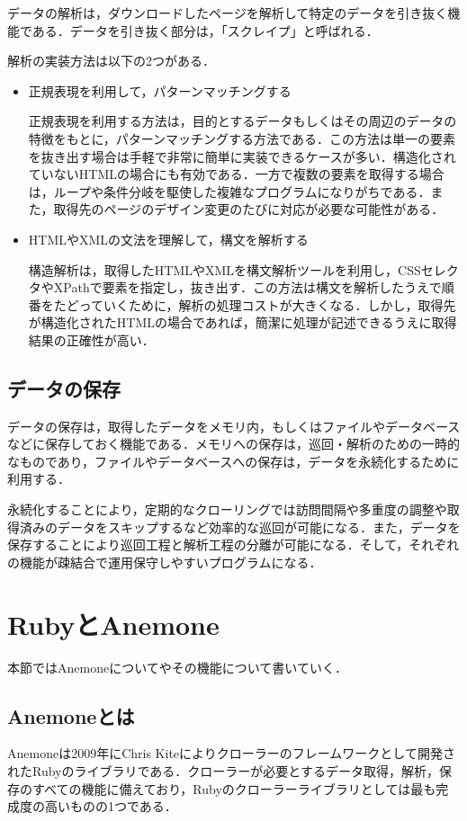 データの解析は，ダウンロードしたページを解析して特定のデータを引き抜く機能である．データを引き抜く部分は，「スクレイプ」と呼ばれる．

解析の実装方法は以下の2つがある．

\begin{itemize}
  \item 正規表現を利用して，パターンマッチングする

正規表現を利用する方法は，目的とするデータもしくはその周辺のデータの特徴をもとに，パターンマッチングする方法である．この方法は単一の要素を抜き出す場合は手軽で非常に簡単に実装できるケースが多い．構造化されていないHTMLの場合にも有効である．一方で複数の要素を取得する場合は，ループや条件分岐を駆使した複雑なプログラムになりがちである．また，取得先のページのデザイン変更のたびに対応が必要な可能性がある．
  \item HTMLやXMLの文法を理解して，構文を解析する

構造解析は，取得したHTMLやXMLを構文解析ツールを利用し，CSSセレクタやXPathで要素を指定し，抜き出す．この方法は構文を解析したうえで順番をたどっていくために，解析の処理コストが大きくなる．しかし，取得先が構造化されたHTMLの場合であれば，簡潔に処理が記述できるうえに取得結果の正確性が高い\cite{miyake}．
\end{itemize}

\subsection{データの保存}

データの保存は，取得したデータをメモリ内，もしくはファイルやデータベースなどに保存しておく機能である．メモリへの保存は，巡回・解析のための一時的なものであり，ファイルやデータベースへの保存は，データを永続化するために利用する．

永続化することにより，定期的なクローリングでは訪問間隔や多重度の調整や取得済みのデータをスキップするなど効率的な巡回が可能になる．また，データを保存することにより巡回工程と解析工程の分離が可能になる．そして，それぞれの機能が疎結合で運用保守しやすいプログラムになる\cite{miyake}．


\section{RubyとAnemone}
本節ではAnemoneについてやその機能について書いていく．


\subsection{Anemoneとは}
Anemoneは2009年にChris Kiteによりクローラーのフレームワークとして開発されたRubyのライブラリである．クローラーが必要とするデータ取得，解析，保存のすべての機能に備えており，Rubyのクローラーライブラリとしては最も完成度の高いものの1つである．

